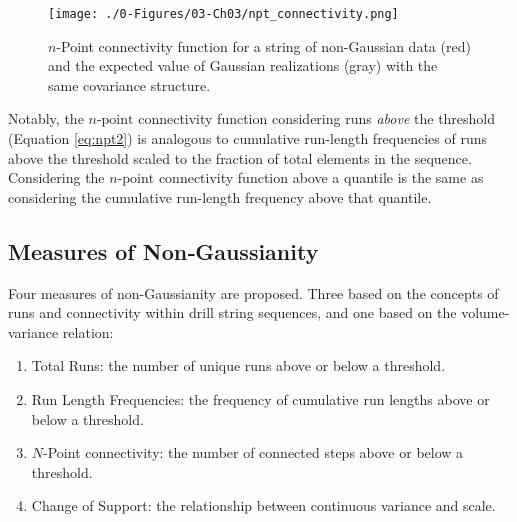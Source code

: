 \begin{figure}[htb!]
    \centering
    \texttt{[image: ./0-Figures/03-Ch03/npt\_connectivity.png]}
    \caption{$n$-Point connectivity function for a string of non-Gaussian data (red) and the expected value of Gaussian realizations (gray) with the same covariance structure.}
    \label{fig:npt_connectivity}
\end{figure}

Notably, the $n\text{-point}$ connectivity function considering runs \emph{above} the threshold (Equation \ref{eq:npt2}) is analogous to cumulative run-length frequencies of runs above the threshold scaled to the fraction of total elements in the sequence. Considering the $n\text{-point}$ connectivity function above a quantile is the same as considering the cumulative run-length frequency above that quantile.

\FloatBarrier
\subsection{Measures of Non‐Gaussianity}
\label{subsec:03ngmeasures}

Four measures of non-Gaussianity are proposed. Three based on the concepts of runs and connectivity within drill string sequences, and one based on the volume-variance relation:
\begin{enumerate}[noitemsep]
    \item Total Runs: the number of unique runs above or below a threshold.
    \item Run Length Frequencies: the frequency of cumulative run lengths above or below a threshold.
    \item $N$-Point connectivity: the number of connected steps above or below a threshold.
    \item Change of Support: the relationship between continuous variance and scale.
\end{enumerate}

